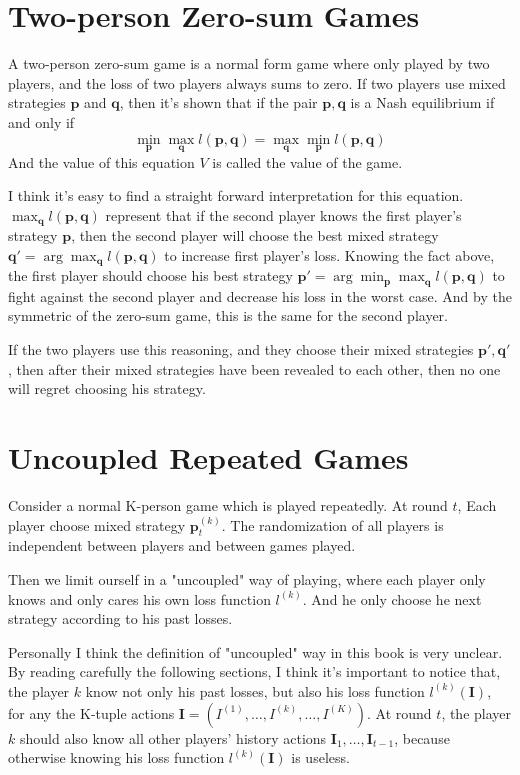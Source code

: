 \documentclass{article} %
\begin{document}
\section{Two-person Zero-sum Games}
A two-person zero-sum game is a normal form game where only played by two players, and the loss of two players always sums to zero. If two players use mixed strategies $\mathbf{p}$ and $\mathbf{q}$, then it's shown that if the pair $\mathbf{p},\mathbf{q}$ is a Nash equilibrium if and only if
$$
\min_{\mathbf{p}} \max_{\mathbf{q}} l(\mathbf{p},\mathbf{q}) = \max_{\mathbf{q}} \min_{\mathbf{p}} l(\mathbf{p},\mathbf{q})
$$
And the value of this equation $V$ is called the value of the game.

I think it's easy to find a straight forward interpretation for this equation. $\max_{\mathbf{q}} l(\mathbf{p},\mathbf{q})$ represent that if the second player knows the first player's strategy $\mathbf{p}$, then the second player will choose the best mixed strategy $\mathbf{q}' = \arg\max_{\mathbf{q}}l(\mathbf{p},\mathbf{q})$ to increase first player's loss. Knowing the fact above, the first player should choose his best strategy $\mathbf{p}' = \arg\min_{\mathbf{p}}\max_{\mathbf{q}}l(\mathbf{p},\mathbf{q})$ to fight against the second player and decrease his loss in the worst case. And by the symmetric of the zero-sum game, this is the same for the second player.

If the two players use this reasoning, and they choose their mixed strategies $\mathbf{p}',\mathbf{q}'$, then after their mixed strategies have been revealed to each other, then no one will regret choosing his strategy.

\section{Uncoupled Repeated Games}
Consider a normal K-person game which is played repeatedly. At round $t$, Each player choose mixed strategy $\mathbf{p}^{(k)}_t$. The randomization of all players is independent between players and between games played.

Then we limit ourself in a "uncoupled" way of playing, where each player only knows and only cares his own loss function $l^{(k)}$. And he only choose he next strategy according to his past losses. 

Personally I think the definition of "uncoupled" way in this book is very unclear. By reading carefully the following sections, I think it's important to notice that, the player $k$ know not only his past losses, but also his loss function $l^{(k)}(\mathbf{I})$, for any the K-tuple actions $\mathbf{I}=(I^{(1)},\dots,I^{(k)},\dots,I^{(K)})$. At round $t$, the player $k$ should also know all other players' history actions $\mathbf{I}_1,\dots,\mathbf{I}_{t-1}$, because otherwise knowing his loss function $l^{(k)}(\mathbf{I})$ is useless.
\end{document}
